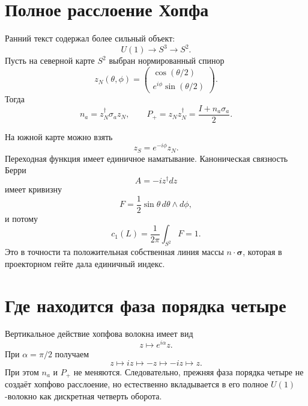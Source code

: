 \section{Полное расслоение Хопфа}

Ранний текст содержал более сильный объект:
\begin{equation}
 U(1)\longrightarrow S^3\longrightarrow S^2.
 \label{eq:v5-hopf-fibration}
\end{equation}
Пусть на северной карте $S^2$ выбран нормированный спинор
\begin{equation}
 z_N(\theta,\phi)=
 \begin{pmatrix}
  \cos(\theta/2)\\
  e^{i\phi}\sin(\theta/2)
 \end{pmatrix}.
 \label{eq:v5-hopf-north-section}
\end{equation}
Тогда
\begin{equation}
 n_a=z_N^\dagger\sigma_a z_N,
 \qquad
 P_+=z_Nz_N^\dagger=\frac{I+n_a\sigma_a}{2}.
 \label{eq:v5-hopf-projector}
\end{equation}

На южной карте можно взять
\begin{equation}
 z_S=e^{-i\phi}z_N.
\end{equation}
Переходная функция имеет единичное наматывание. Каноническая связность
Берри
\begin{equation}
 A=-iz^\dagger dz
\end{equation}
имеет кривизну
\begin{equation}
 F=\frac12\sin\theta\,d\theta\wedge d\phi,
\end{equation}
и потому
\begin{equation}
 c_1(L)=\frac1{2\pi}\int_{S^2}F=1.
 \label{eq:v5-hopf-c1-one}
\end{equation}
Это в точности та положительная собственная линия массы
$n\cdot\boldsymbol\sigma$, которая в проекторном гейте дала единичный
индекс.

\section{Где находится фаза порядка четыре}

Вертикальное действие хопфова волокна имеет вид
\begin{equation}
 z\longmapsto e^{i\alpha}z.
\end{equation}
При $\alpha=\pi/2$ получаем
\begin{equation}
 z\mapsto iz\mapsto-z\mapsto-iz\mapsto z.
\end{equation}
При этом $n_a$ и $P_+$ не меняются. Следовательно, прежняя фаза порядка
четыре не создаёт хопфово расслоение, но естественно вкладывается в его
полное $U(1)$-волокно как дискретная четверть оборота.

